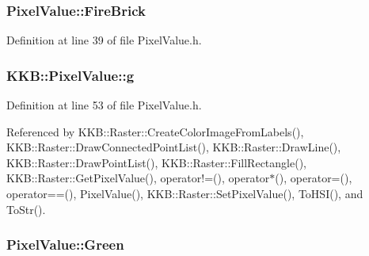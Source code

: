 \subsubsection[{\texorpdfstring{Fire\+Brick}{FireBrick}}]{ Pixel\+Value\+::\+Fire\+Brick\hspace{0.3cm}{\ttfamily [static]}}\hypertarget{class_k_k_b_1_1_pixel_value_a81ee11998b9a53025dffa8ef409cc0ee}{}\label{class_k_k_b_1_1_pixel_value_a81ee11998b9a53025dffa8ef409cc0ee}


Definition at line 39 of file Pixel\+Value.\+h.

\subsubsection[{\texorpdfstring{g}{g}}]{ K\+K\+B\+::\+Pixel\+Value\+::g}\hypertarget{class_k_k_b_1_1_pixel_value_ab9b7056f3cf6f67a5987a8119ceaab67}{}\label{class_k_k_b_1_1_pixel_value_ab9b7056f3cf6f67a5987a8119ceaab67}


Definition at line 53 of file Pixel\+Value.\+h.



Referenced by K\+K\+B\+::\+Raster\+::\+Create\+Color\+Image\+From\+Labels(), K\+K\+B\+::\+Raster\+::\+Draw\+Connected\+Point\+List(), K\+K\+B\+::\+Raster\+::\+Draw\+Line(), K\+K\+B\+::\+Raster\+::\+Draw\+Point\+List(), K\+K\+B\+::\+Raster\+::\+Fill\+Rectangle(), K\+K\+B\+::\+Raster\+::\+Get\+Pixel\+Value(), operator!=(), operator$\ast$(), operator=(), operator==(), Pixel\+Value(), K\+K\+B\+::\+Raster\+::\+Set\+Pixel\+Value(), To\+H\+S\+I(), and To\+Str().

\subsubsection[{\texorpdfstring{Green}{Green}}]{ Pixel\+Value\+::\+Green\hspace{0.3cm}{\ttfamily [static]}}\hypertarget{class_k_k_b_1_1_pixel_value_a151caa1579d95170de6eccdd0947bf58}{}\label{class_k_k_b_1_1_pixel_value_a151caa1579d95170de6eccdd0947bf58}


